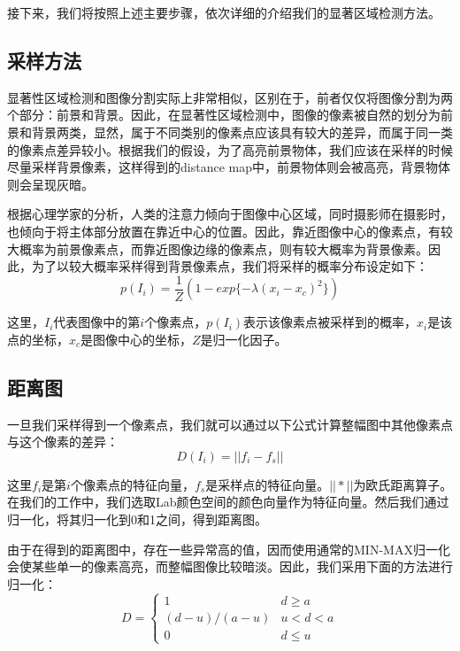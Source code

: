 接下来，我们将按照上述主要步骤，依次详细的介绍我们的显著区域检测方法。

\subsection{采样方法}
显著性区域检测和图像分割实际上非常相似，区别在于，前者仅仅将图像分割为两个部分：前景和背景。因此，在显著性区域检测中，图像的像素被自然的划分为前景和背景两类，显然，属于不同类别的像素点应该具有较大的差异，而属于同一类的像素点差异较小。根据我们的假设，为了高亮前景物体，我们应该在采样的时候尽量采样背景像素，这样得到的distance map中，前景物体则会被高亮，背景物体则会呈现灰暗。

根据心理学家的分析\cite{tatler2007central}，人类的注意力倾向于图像中心区域，同时摄影师在摄影时，也倾向于将主体部分放置在靠近中心的位置。因此，靠近图像中心的像素点，有较大概率为前景像素点，而靠近图像边缘的像素点，则有较大概率为背景像素。因此，为了以较大概率采样得到背景像素点，我们将采样的概率分布设定如下：
\begin{equation}
p(I_i) = \frac{1}{Z}(1-exp\{-\lambda(x_i-x_c)^2\})
\end{equation}

这里，$I_i$代表图像中的第$i$个像素点，$p(I_i)$表示该像素点被采样到的概率，$x_i$是该点的坐标，$x_c$是图像中心的坐标，$Z$是归一化因子。

\subsection{距离图}
一旦我们采样得到一个像素点，我们就可以通过以下公式计算整幅图中其他像素点与这个像素的差异：
\begin{equation}
D(I_i) = ||f_i - f_s|| \label{eq:dis}
\end{equation}

这里$f_i$是第$i$个像素点的特征向量，$f_s$是采样点的特征向量。$||*||$为欧氏距离算子。在我们的工作中，我们选取Lab颜色空间的颜色向量作为特征向量。然后我们通过归一化，将其归一化到0和1之间，得到距离图。

由于在得到的距离图中，存在一些异常高的值，因而使用通常的MIN-MAX归一化会使某些单一的像素高亮，而整幅图像比较暗淡。因此，我们采用下面的方法进行归一化：
\begin{equation}
D = 
\begin{cases}
1& d \geq a\\
(d-u)/(a-u) & u<d<a\\
0& d \leq u
\end{cases}
\end{equation}

